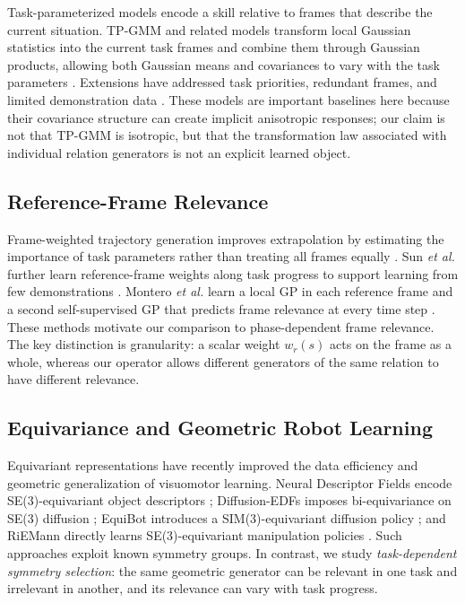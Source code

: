 \documentclass[letterpaper,10pt,conference]{ieeeconf}
\begin{document}
Task-parameterized models encode a skill relative to frames that describe the
current situation. TP-GMM and related models transform local Gaussian
statistics into the current task frames and combine them through Gaussian
products, allowing both Gaussian means and covariances to vary with the task
parameters \cite{Calinon2014TPGMM,Calinon2016Tutorial,Calinon2018TPModels}.
Extensions have addressed task priorities, redundant frames, and limited
demonstration data \cite{Huang2018GeneralizedTP,Silverio2019TaskPriorities,
Zhu2022FewTP}. These models are important baselines here because their
covariance structure can create implicit anisotropic responses; our claim is
not that TP-GMM is isotropic, but that the transformation law associated with
individual relation generators is not an explicit learned object.

\subsection{Reference-Frame Relevance}

Frame-weighted trajectory generation improves extrapolation by estimating the
importance of task parameters rather than treating all frames equally
\cite{Sena2019FrameWeighted}. Sun \emph{et al.} further learn reference-frame
weights along task progress to support learning from few demonstrations
\cite{Sun2024FrameWeighted}. Montero \emph{et al.} learn a local GP in each
reference frame and a second self-supervised GP that predicts frame relevance
at every time step \cite{Montero2024TPGP}. These methods motivate our comparison
to phase-dependent frame relevance. The key distinction is granularity:
a scalar weight $w_r(s)$ acts on the frame as a whole, whereas our operator
allows different generators of the same relation to have different relevance.

\subsection{Equivariance and Geometric Robot Learning}

Equivariant representations have recently improved the data efficiency and
geometric generalization of visuomotor learning. Neural Descriptor Fields
encode SE(3)-equivariant object descriptors \cite{Simeonov2022NDF};
Diffusion-EDFs imposes bi-equivariance on SE(3) diffusion
\cite{Ryu2024DiffusionEDF}; EquiBot introduces a SIM(3)-equivariant diffusion
policy \cite{Yang2024EquiBot}; and RiEMann directly learns SE(3)-equivariant
manipulation policies \cite{Gao2024RiEMann}. Such approaches exploit known
symmetry groups. In contrast, we study \emph{task-dependent symmetry
selection}: the same geometric generator can be relevant in one task and
irrelevant in another, and its relevance can vary with task progress.
\end{document}
